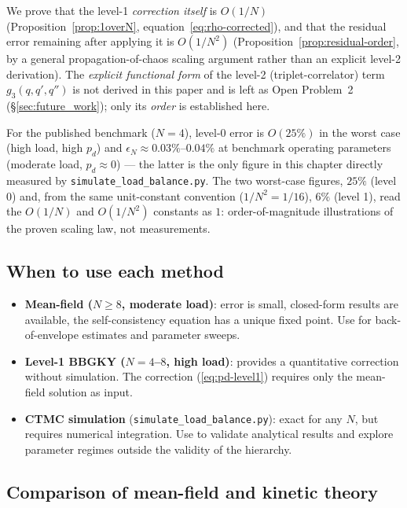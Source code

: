 \documentclass[11pt,a4paper]{report}
\newcommand{\pd}{p_d}
\begin{document}
We prove that the level-1 \emph{correction itself} is $O(1/N)$
(Proposition~\ref{prop:1overN}, equation~\eqref{eq:rho-corrected}), and
that the residual error remaining after applying it is $O(1/N^2)$
(Proposition~\ref{prop:residual-order}, by a general propagation-of-chaos
scaling argument rather than an explicit level-2 derivation). The
\emph{explicit functional form} of the level-2 (triplet-correlator)
term $g_3(q,q',q'')$ is not derived in this paper and is left as Open
Problem~2 (\S\ref{sec:future_work}); only its \emph{order} is
established here.

For the published benchmark ($N=4$), level-0 error is $O(25\%)$ in the
worst case (high load, high $\pd$) and $\epsilon_N \approx
0.03\%$--$0.04\%$ at benchmark operating parameters (moderate load,
$\pd \approx 0$) --- the latter is the only figure in this chapter
directly measured by \texttt{simulate\_load\_balance.py}. The two
worst-case figures, $25\%$ (level 0) and, from the same unit-constant
convention ($1/N^2 = 1/16$), $6\%$ (level 1), read the $O(1/N)$ and
$O(1/N^2)$ constants as $1$: order-of-magnitude illustrations of the
proven scaling law, not measurements.

\subsection{When to use each method}

\begin{itemize}
  \item \textbf{Mean-field ($N \geq 8$, moderate load)}: error is small,
        closed-form results are available, the self-consistency equation
        has a unique fixed point.  Use for back-of-envelope estimates and
        parameter sweeps.

  \item \textbf{Level-1 BBGKY ($N=4$--$8$, high load)}: provides
        a quantitative correction without simulation.  The correction
        (\ref{eq:pd-level1}) requires only the mean-field solution as input.

  \item \textbf{CTMC simulation} (\texttt{simulate\_load\_balance.py}):
        exact for any $N$, but requires numerical integration.
        Use to validate analytical results and explore parameter regimes
        outside the validity of the hierarchy.
\end{itemize}

\subsection{Comparison of mean-field and kinetic theory}
\end{document}
